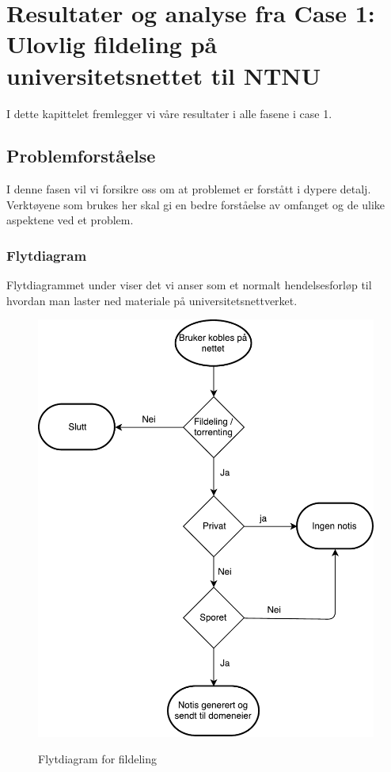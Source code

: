 \chapter{Resultater og analyse fra Case 1: Ulovlig fildeling på universitetsnettet til NTNU}
I dette kapittelet fremlegger vi våre resultater i alle fasene i case 1.

\section{Problemforståelse}
I denne fasen vil vi forsikre oss om at problemet er forstått i dypere detalj. Verktøyene som brukes her skal gi en bedre forståelse av omfanget og de ulike aspektene ved et problem.

\subsection{Flytdiagram}
Flytdiagrammet under viser det vi anser som et normalt hendelsesforløp til hvordan man laster ned materiale på universitetsnettverket.

\begin{figure}[H]
    \centering
    \includegraphics[scale=0.5]{case_1/bilder/Flowchart.pdf}
    \label{fig:Flytdiagram}
    \caption[Flytdiagram for fildeling]{Flytdiagram for fildeling}
\end{figure}

